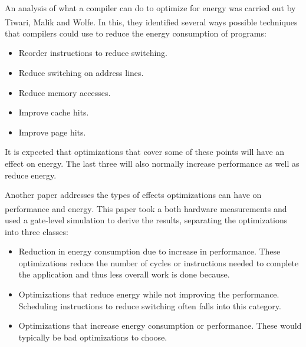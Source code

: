 \documentclass[twocolumn]{article}
\let\oldcite\cite
\renewcommand{\cite}[1]{\textsuperscript{\oldcite{#1}}}
\begin{document}
An analysis of what a compiler can do to optimize for energy was carried out by Tiwari, Malik and Wolfe\cite{CompilationTechniquesForLowEnergy}. In this, they identified several ways possible techniques that compilers could use to reduce the energy consumption of programs:
\begin{itemize}
	\setlength{\itemsep}{0em}
	\vspace{-1mm}

	\item Reorder instructions to reduce switching.
	\item Reduce switching on address lines.
	\item Reduce memory accesses.
	\item Improve cache hits.
	\item Improve page hits.
\end{itemize}

It is expected that optimizations that cover some of these points will have an effect on energy. The last three will also normally increase performance as well as reduce energy.

Another paper addresses the types of effects optimizations can have on performance and energy\cite{WhatCanAPoorCompilerDo}. This paper took a both hardware measurements and used a gate-level simulation to derive the results,  separating the optimizations into three classes:
\begin{itemize}
	\setlength{\itemsep}{0em}
	\vspace{-1mm}
	\item Reduction in energy consumption due to increase in performance. These optimizations reduce the number of cycles or instructions needed to complete the application and thus less overall work is done because.
	\item Optimizations that reduce energy while not improving the performance. Scheduling instructions to reduce switching often falls into this category.
	\item Optimizations that increase energy consumption or performance. These would typically be bad optimizations to choose.
\end{itemize}
\end{document}
